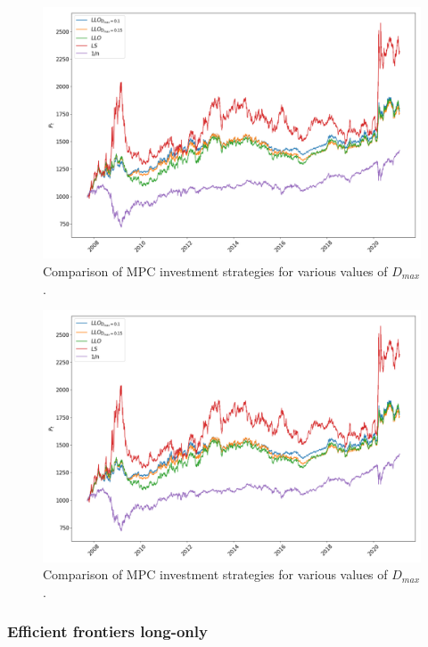 \begin{figure}[H]
    \centering
    \includegraphics[width=1\textwidth]{analysis/portfolio_exercise/images/mle/port_vals_llo.png}
    \caption[Comparison of MPC investment strategies for various values of $D_{max}$]{Comparison of MPC investment strategies for various values of $D_{max}$.}
    \label{fig:MPC_port_vals_ls}
\end{figure}

\begin{figure}[H]
    \centering
    \includegraphics[width=1\textwidth]{analysis/portfolio_exercise/images/mle/port_vals_llo.png}
    \caption[Comparison of MPC investment strategies for various values of $D_{max}$]{Comparison of MPC investment strategies for various values of $D_{max}$.}
    \label{fig:MPC_port_vals_llo}
\end{figure}


\subsubsection*{Efficient frontiers long-only}

